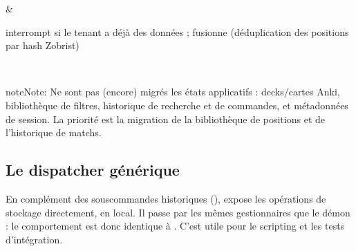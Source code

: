 \documentclass[letterpaper,10pt,french]{sphinxmanual}
\begin{document}
\begin{savenotes}
\begin{tabular}[t]{}
\begin{varwidth}[t]{}
\sphinxbeforeendvarwidth
\end{varwidth}%
&\begin{varwidth}[t]{}
\sphinxAtStartPar
{} interrompt si le tenant a déjà des données ;  fusionne
(déduplication des positions par hash Zobrist)
\sphinxbeforeendvarwidth
\end{varwidth}%
\\
\sphinxbottomrule
\end{tabular}
\sphinxtableafterendhook\par
\sphinxattableend\end{savenotes}

\begin{sphinxadmonition}{note}{Note:}
\sphinxAtStartPar
Ne sont pas (encore) migrés les états applicatifs : decks/cartes Anki,
bibliothèque de filtres, historique de recherche et de commandes, et
métadonnées de session. La priorité est la migration de la bibliothèque de
positions et de l’historique de matchs.
\end{sphinxadmonition}


\subsection{Le dispatcher générique }
\label{\detokenize{mode_headless:le-dispatcher-generique-call}}\label{\detokenize{mode_headless:headless-call}}
\sphinxAtStartPar
En complément des sous\sphinxhyphen{}commandes historiques ({\hyperref[\detokenize{cli:cli}]{}}), 
expose  les opérations de stockage directement, en local. Il passe
par les mêmes gestionnaires que le démon  : le comportement est donc
identique à . C’est utile pour le scripting et
les tests d’intégration.
\end{document}
